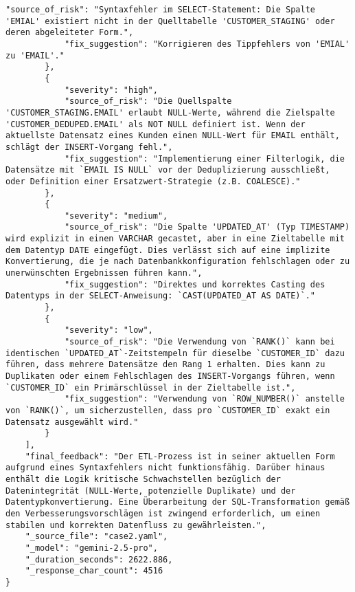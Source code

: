\begin{lstlisting}[caption={Ausgabe: GEMINI 2.5 Pro Anwendungsfall 2 Robustheitsdurchlauf},label={gemini_case2_prompt3}]
            "source_of_risk": "Syntaxfehler im SELECT-Statement: Die Spalte 'EMIAL' existiert nicht in der Quelltabelle 'CUSTOMER_STAGING' oder deren abgeleiteter Form.",
            "fix_suggestion": "Korrigieren des Tippfehlers von 'EMIAL' zu 'EMAIL'."
        },
        {
            "severity": "high",
            "source_of_risk": "Die Quellspalte 'CUSTOMER_STAGING.EMAIL' erlaubt NULL-Werte, während die Zielspalte 'CUSTOMER_DEDUPED.EMAIL' als NOT NULL definiert ist. Wenn der aktuellste Datensatz eines Kunden einen NULL-Wert für EMAIL enthält, schlägt der INSERT-Vorgang fehl.",
            "fix_suggestion": "Implementierung einer Filterlogik, die Datensätze mit `EMAIL IS NULL` vor der Deduplizierung ausschließt, oder Definition einer Ersatzwert-Strategie (z.B. COALESCE)."
        },
        {
            "severity": "medium",
            "source_of_risk": "Die Spalte 'UPDATED_AT' (Typ TIMESTAMP) wird explizit in einen VARCHAR gecastet, aber in eine Zieltabelle mit dem Datentyp DATE eingefügt. Dies verlässt sich auf eine implizite Konvertierung, die je nach Datenbankkonfiguration fehlschlagen oder zu unerwünschten Ergebnissen führen kann.",
            "fix_suggestion": "Direktes und korrektes Casting des Datentyps in der SELECT-Anweisung: `CAST(UPDATED_AT AS DATE)`."
        },
        {
            "severity": "low",
            "source_of_risk": "Die Verwendung von `RANK()` kann bei identischen `UPDATED_AT`-Zeitstempeln für dieselbe `CUSTOMER_ID` dazu führen, dass mehrere Datensätze den Rang 1 erhalten. Dies kann zu Duplikaten oder einem Fehlschlagen des INSERT-Vorgangs führen, wenn `CUSTOMER_ID` ein Primärschlüssel in der Zieltabelle ist.",
            "fix_suggestion": "Verwendung von `ROW_NUMBER()` anstelle von `RANK()`, um sicherzustellen, dass pro `CUSTOMER_ID` exakt ein Datensatz ausgewählt wird."
        }
    ],
    "final_feedback": "Der ETL-Prozess ist in seiner aktuellen Form aufgrund eines Syntaxfehlers nicht funktionsfähig. Darüber hinaus enthält die Logik kritische Schwachstellen bezüglich der Datenintegrität (NULL-Werte, potenzielle Duplikate) und der Datentypkonvertierung. Eine Überarbeitung der SQL-Transformation gemäß den Verbesserungsvorschlägen ist zwingend erforderlich, um einen stabilen und korrekten Datenfluss zu gewährleisten.",
    "_source_file": "case2.yaml",
    "_model": "gemini-2.5-pro",
    "_duration_seconds": 2622.886,
    "_response_char_count": 4516
}
\end{lstlisting}

